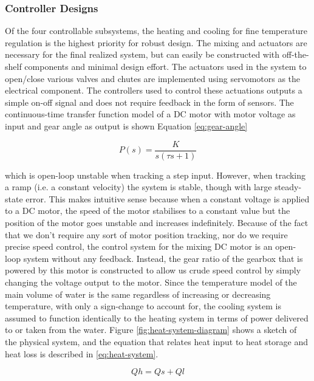 \documentclass{article}
\begin{document}
\subsubsection{Controller Designs}
Of the four controllable subsystems, the heating and cooling for fine temperature regulation is the highest priority for robust design. The mixing and actuators are necessary for the final realized system, but can easily be constructed with off-the-shelf components and minimal design effort. The actuators used in the system to open/close various valves and chutes are implemented using servomotors as the electrical component. The controllers used to control these actuations outputs a simple on-off signal and does not require feedback in the form of sensors. The continuous-time transfer function model of a DC motor with motor voltage as input and gear angle as output is shown Equation \ref{eq:gear-angle}

\begin{equation}
P(s) = \frac{K}{s(\tau s + 1)}
\label{eq:gear-angle}
\end{equation}

which is open-loop unstable when tracking a step input. However, when tracking a ramp (i.e. a constant velocity) the system is stable, though with large steady-state error. This makes intuitive sense because when a constant voltage is applied to a DC motor, the speed of the motor stabilises to a constant value but the position of the motor goes unstable and increases indefinitely. Because of the fact that we don't require any sort of motor position tracking, nor do we require precise speed control, the control system for the mixing DC motor is an open-loop system without any feedback. Instead, the gear ratio of the gearbox that is powered by this motor is constructed to allow us crude speed control by simply changing the voltage output to the motor.
Since the temperature model of the main volume of water is the same regardless of increasing or decreasing temperature, with only a sign-change to account for, the cooling system is assumed to function identically to the heating system in terms of power delivered to or taken from the water. Figure \ref{fig:heat-system-diagram} shows a sketch of the physical system, and the equation that relates heat input to heat storage and heat loss is described in \ref{eq:heat-system}.

\begin{equation}
Qh = Qs + Ql
\label{eq:heat-system}
\end{equation}
\end{document}
